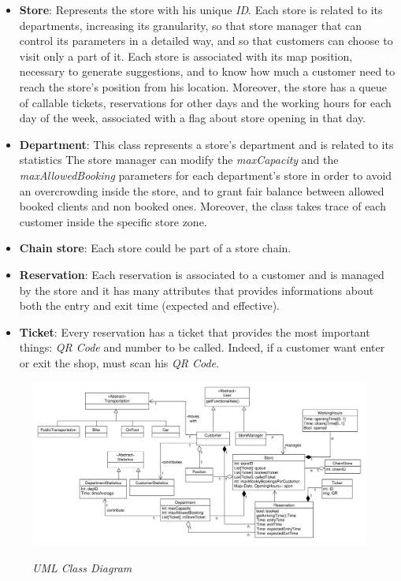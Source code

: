 \documentclass{article}
\begin{document}
\begin{itemize}
\begin{itemize}
				\end{itemize}
			
				\item {\bfseries Store}: Represents the store with his unique \emph{ID}. Each store is related to its departments, increasing its granularity, so that store manager that can control its parameters in a detailed way, and so that customers can choose to visit only a part of it. Each store is associated with its map position, necessary to generate suggestions, and to know how much a customer need to reach the store's position from his location. Moreover, the store has a  queue of callable tickets, reservations for other days and the working hours for each day of the week, associated with a flag about store opening in that day.
				
				\item {\bfseries Department}: This class represents a store's department and is related to its statistics The store manager can modify the \emph{maxCapacity} and the \emph{maxAllowedBooking} parameters for each department's store in order to avoid an overcrowding inside the store, and to grant fair balance between allowed booked clients and non booked ones. Moreover, the class takes trace of each customer inside the specific store zone.
				
				\item {\bfseries Chain store}: Each store could be part of a store chain.
				
				\item {\bfseries Reservation}: Each reservation is associated to a customer and is managed by the store and it has many attributes that provides informations about both the entry and exit time (expected and effective).
				
				\item {\bfseries Ticket}: Every reservation has a ticket that provides the most important things: \emph{QR Code} and number to be called. Indeed, if a customer want enter or exit the shop, must scan his \emph{QR Code}.
			\end{itemize}
		
			\begin{figure}
			\begin{adjustwidth}{-3cm}{}
				\centering
				\includegraphics[scale=0.45, angle=90, trim= 0 0 0 -5cm]{ClassDiagrams/classDiagram.pdf} \\
				\caption{\emph{UML Class Diagram}}
			\end{adjustwidth}
		\end{figure}
	
\end{document}
